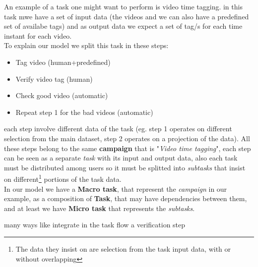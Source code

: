 



An example of a task one might want to perform is video time tagging. in this task mwe have a
set of input data (the videos and we can also have a predefined set of availabe tags) and
as output data we expect a set of tag/s for each time instant for each video.\\

To explain our model we split this task in these steps:
\begin{itemize}
	\item Tag video (human+predefined)
	\item Verify video tag (human)
	\item Check good video (automatic)
	\item Repeat step 1 for the bad videos (automatic)
\end{itemize}
each step involve different data of the task (eg. step 1 operates on different selection
from the main dataset, step 2 operates on a projection of the data). All these steps belong
to the same \textbf{campaign} that is "\emph{Video time tagging}", each step can be seen as
a separate \emph{task} with its input and output data, also each task must be distributed
among users so it must be splitted into \emph{subtasks} that insist on different\footnote{The
data they insist on are selection from the task input data, with or without overlapping}
portions of the task data.\\

In our model we have a \textbf{Macro task}, that represent the \emph{campaign} in our example,
as a composition of \textbf{Task}, that may have dependencies between them, and at least we
have \textbf{Micro task} that represents the \emph{subtasks}.



many ways like integrate in the task flow a verification step
